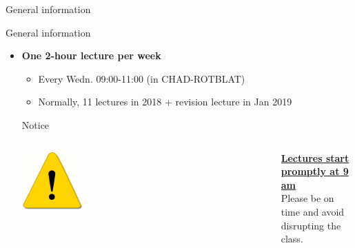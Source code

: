 \begin{frame}{General information}

\end{frame}

%
%
%

\begin{frame}{General information}

\begin{itemize}
\item {\bf One 2-hour lecture per week}
   \begin{itemize}
       \item Every Wedn. 09:00-11:00 (in CHAD-ROTBLAT)
       \item Normally, 11 lectures in 2018 + revision lecture in Jan 2019
    \end{itemize}

\vspace{0.1cm}
\begin{block001}{Notice}
\begin{columns}
  \begin{column}{0.20\textwidth}
   \begin{center}
     \includegraphics[width=0.25\textwidth]{./images/icons/warning.png}\\
   \end{center}
  \end{column}
  \begin{column}{0.80\textwidth}
  {\small
       {\bf \underline{Lectures start promptly at 9 am}}\\
       Please be on time and avoid disrupting the class.
   }
  \end{column}
\end{columns}
\end{block001}
\vspace{0.1cm}


\end{itemize}
\end{frame}
